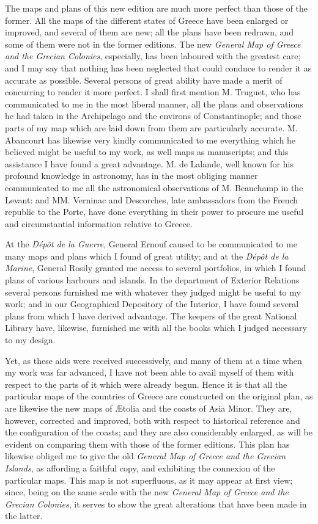 \documentclass[a4paper, 11pt, oneside, polutonikogreek, english]{article}
\begin{document}
The maps and plans of this new edition are much more perfect than those of the former. All the maps of the different states of Greece have been enlarged or improved, and several of them are new; all the plans have been redrawn, and some of them were not in the former editions. The new \emph{General Map of Greece and the Grecian Colonies}, especially, has been laboured with the greatest care; and I may say that nothing has been neglected that could conduce to render it as accurate as possible. Several persons of great ability have made a merit of concurring to render it more perfect. I shall first mention M. Truguet, who has communicated to me in the most liberal manner, all the plans and observations he had taken in the Archipelago and the environs of Constantinople; and those parts of my map which are laid down from them are particularly accurate. M. Abancourt has likewise very kindly communicated to me everything which he believed might be useful to my work, as well maps as manuscripts; and this assistance I have found a great advantage. M. de Lalande, well known for his profound knowledge in astronomy, has in the most obliging manner communicated to me all the astronomical observations of M. Beauchamp in the Levant: and MM. Verninac and Descorches, late ambassadors from the French republic to the Porte, have done everything in their power to procure me useful and circumstantial information relative to Greece.

At the \emph{Dépôt de la Guerre}, General Ernouf caused to be communicated to me many maps and plans which I found of great utility; and at the \emph{Dépôt de la Marine}, General Rosily granted me access to several portfolios, in which I found plans of various harbours and islands. In the department of Exterior Relations several persons furnished me with whatever they judged might be useful to my work; and in our Geographical Depository of the Interior, I have found several plans from which I have derived advantage. The keepers of the great National Library have, likewise, furnished me with all the books which I judged necessary to my design.

Yet, as these aids were received successively, and many of them at a time when my work was far advanced, I have not been able to avail myself of them with respect to the parts of it which were already begun. Hence it is that all the particular maps of the countries of Greece are constructed on the original plan, as are likewise the new maps of Ætolia and the coasts of Asia Minor. They are, however, corrected and improved, both with respect to historical reference and the configuration of the coasts; and they are also considerably enlarged, as will be evident on comparing them with those of the former editions. This plan has likewise obliged me to give the old \emph{General Map of Greece and the Grecian Islands}, as affording a faithful copy, and exhibiting the connexion of the particular maps. This map is not superfluous, as it may appear at first view; since, being on the same scale with the new \emph{General Map of Greece and the Grecian Colonies}, it serves to show the great alterations that have been made in the latter.
\end{document}
